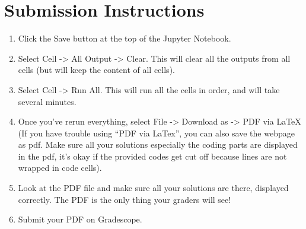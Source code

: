\documentclass[11pt]{article}
\providecommand{\tightlist}{%
      \setlength{\itemsep}{0pt}\setlength{\parskip}{0pt}}
\begin{document}
    \section{\texorpdfstring{ Submission
Instructions}{ Submission Instructions}}\label{submission-instructions}

\begin{enumerate}
\def\labelenumi{\arabic{enumi}.}
\tightlist
\item
  Click the Save button at the top of the Jupyter Notebook.
\item
  Select Cell -\textgreater{} All Output -\textgreater{} Clear. This
  will clear all the outputs from all cells (but will keep the content
  of all cells).
\item
  Select Cell -\textgreater{} Run All. This will run all the cells in
  order, and will take several minutes.
\item
  Once you've rerun everything, select File -\textgreater{} Download as
  -\textgreater{} PDF via LaTeX (If you have trouble using ``PDF via
  LaTex'', you can also save the webpage as pdf. Make sure all your
  solutions especially the coding parts are displayed in the pdf, it's
  okay if the provided codes get cut off because lines are not wrapped
  in code cells).
\item
  Look at the PDF file and make sure all your solutions are there,
  displayed correctly. The PDF is the only thing your graders will see!
\item
  Submit your PDF on Gradescope.
\end{enumerate}


    
    
    
\end{document}
